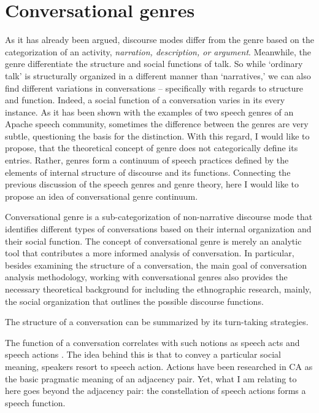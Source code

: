 \documentclass[12pt, draft]{article}
\begin{document}
\section{Conversational genres}
As it has already been argued, discourse modes differ from the genre based on the categorization of an activity, \textit{narration, description, or argument}. Meanwhile, the genre differentiate the structure and social functions of talk. So while `ordinary talk' is structurally organized in a different manner than `narratives,' we can also find different variations in conversations -- specifically with regards to structure and function. Indeed, a social function of a conversation varies in its every instance. As it has been shown with the examples of two speech genres of an Apache speech community, sometimes the difference between the genres are very subtle, questioning the basis for the distinction. With this regard, I would like to propose, that the theoretical concept of genre does not categorically define its entries. Rather, genres form a continuum of speech practices defined by the elements of internal structure of discourse and its functions. 
Connecting the previous discussion of the speech genres and genre theory, here I would like to propose an idea of conversational genre continuum. 

Conversational genre is a sub-categorization of non-narrative discourse mode that identifies different types of conversations based on their internal organization and their social function. The concept of conversational genre is merely an analytic tool that contributes a more informed analysis of conversation. In particular, besides examining the structure of a conversation, the main goal of conversation analysis methodology, working with conversational genres also provides the necessary theoretical background for including the ethnographic research, mainly, the social organization that outlines the possible discourse functions. 

The structure of a conversation can be summarized by its turn-taking strategies. 

The function of a conversation correlates with such notions as speech acts \parencite{searle2011} and speech actions \parencite{levinson2013}. The idea behind this is that to convey a particular social meaning, speakers resort to speech action. Actions have been researched in CA as the basic pragmatic meaning of an adjacency pair. Yet, what I am relating to here goes beyond the adjacency pair: the constellation of speech actions forms a speech function. 
\end{document}
